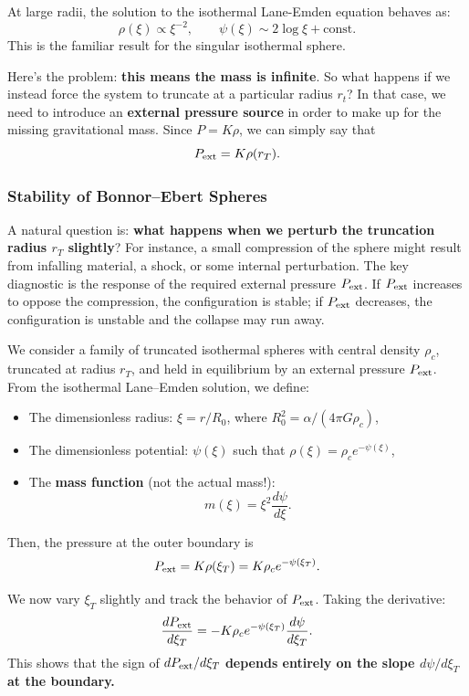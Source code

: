\begin{tcolorbox}[colback=blue!5!white, colframe=blue!75!black, title=Asymptotic Form]
At large radii, the solution to the isothermal Lane-Emden equation behaves as:
\[
\boxed{
\rho(\xi) \propto \xi^{-2}, \qquad \psi(\xi) \sim 2 \log \xi + \text{const}.
}
\]
This is the familiar result for the singular isothermal sphere.
\end{tcolorbox}

Here's the problem: \textbf{this means the mass is infinite}. So what happens if we instead force the system to truncate at a particular radius $r_t$? In that case, we need to introduce an \textbf{external pressure source} in order to make up for the missing gravitational mass. Since $P = K \rho$, we can simply say that
\[
P_{\rm ext} = K \rho(r_T).
\]
\subsubsection{Stability of Bonnor–Ebert Spheres}

A natural question is: \textbf{what happens when we perturb the truncation radius $r_T$ slightly}? For instance, a small compression of the sphere might result from infalling material, a shock, or some internal perturbation. The key diagnostic is the response of the required external pressure $P_{\rm ext}$. If $P_{\rm ext}$ increases to oppose the compression, the configuration is stable; if $P_{\rm ext}$ decreases, the configuration is unstable and the collapse may run away.

We consider a family of truncated isothermal spheres with central density $\rho_c$, truncated at radius $r_T$, and held in equilibrium by an external pressure $P_{\rm ext}$. From the isothermal Lane–Emden solution, we define:

\begin{itemize}
    \item The dimensionless radius: $\xi = r / R_0$, where $R_0^2 = \alpha / (4\pi G \rho_c)$,
    \item The dimensionless potential: $\psi(\xi)$ such that $\rho(\xi) = \rho_c e^{-\psi(\xi)}$,
    \item The \textbf{mass function} (not the actual mass!):
    \[
    m(\xi) = \xi^2 \frac{d\psi}{d\xi}.
    \]
\end{itemize}

Then, the pressure at the outer boundary is
\[
P_{\rm ext} = K\rho(\xi_T) = K\rho_c e^{-\psi(\xi_T)}.
\]

We now vary $\xi_T$ slightly and track the behavior of $P_{\rm ext}$. Taking the derivative:
\[
\frac{dP_{\rm ext}}{d\xi_T} = - K \rho_c e^{-\psi(\xi_T)} \frac{d\psi}{d\xi_T}.
\]
This shows that the sign of $dP_{\rm ext}/d\xi_T$ \textbf{depends entirely on the slope $d\psi/d\xi_T$ at the boundary.}

